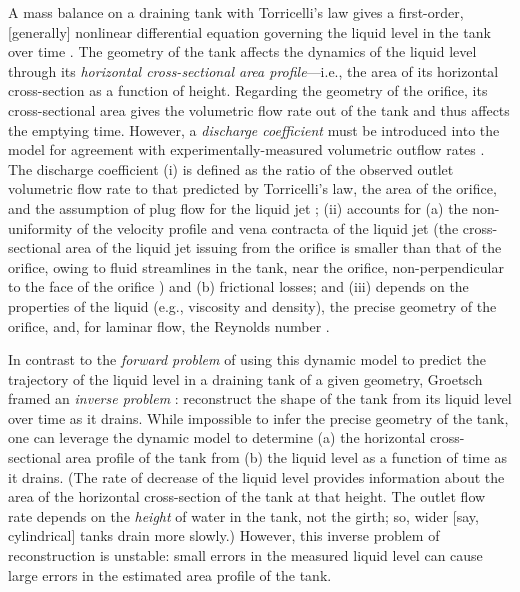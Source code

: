\documentclass[a4paper,fleqn]{cas-dc}
\begin{document}
A mass balance on a draining tank with Torricelli's law gives a first-order, [generally] nonlinear differential equation governing the liquid level in the tank over time \cite{groetsch1993inverse_tl,seborg2016process,debook}.
The geometry of the tank affects the dynamics of the liquid level through its \emph{horizontal cross-sectional area profile}---i.e., the area of its horizontal cross-section as a function of height.
Regarding the geometry of the orifice, its cross-sectional area gives the volumetric flow rate out of the tank and thus affects the emptying time.
However, a \emph{discharge coefficient} \cite{de2000pin,blasone2015discharge,wadhwa2021study,liu2008drainage} must be introduced into the model for agreement with experimentally-measured volumetric outflow rates \cite{farmer1992physical,driver1998torricelli,brady2009siphons,rother2024modelling,paldy1963apparatus,ivanov2014testing,williams2021vessel,pavesi2019investigating,planinvsivc2011holes,saleta2005experimental,lopac2015water,powell2012carrying}.
The discharge coefficient \cite{teoman2022discharge,hicks2014determining,blasone2015discharge,lienhard1984velocity,wadhwa2021study}
(i) is defined as the ratio of the observed outlet volumetric flow rate to that predicted by Torricelli's law, the area of the orifice, and the assumption of plug flow for the liquid jet \cite{hicks2014determining};
(ii) accounts for 
   (a) the non-uniformity of the velocity profile and vena contracta of the liquid jet (the cross-sectional area of the liquid jet issuing from the orifice is smaller than that of the orifice, owing to fluid streamlines in the tank, near the orifice, non-perpendicular to the face of the orifice \cite{horsch2020simple}) and 
   (b) frictional losses; and
(iii) depends on the properties of the liquid (e.g., viscosity and density), the precise geometry of the orifice, and, for laminar flow, the Reynolds number \cite{teoman2022discharge}. 

In contrast to the \emph{forward problem} of using this dynamic model to predict the trajectory of the liquid level in a draining tank of a given geometry, Groetsch \cite{groetsch1993inverse_tl,groetsch1999inverse} framed an \emph{inverse problem} \cite{groetsch1993inverse,neto2012introduction,tarantola2005inverse}: reconstruct the shape of the tank from its liquid level over time as it drains. 
While impossible to infer the precise geometry of the tank, one can leverage the dynamic model to determine
(a) the horizontal cross-sectional area profile of the tank from (b) the liquid level as a function of time as it drains. (The rate of decrease of the liquid level provides information about the area of the horizontal cross-section of the tank at that height. The outlet flow rate depends on the \emph{height} of water in the tank, not the girth; so, wider [say, cylindrical] tanks drain more slowly.)
However, this inverse problem of reconstruction is unstable: small errors in the measured liquid level can cause large errors in the estimated area profile of the tank. \cite{groetsch1993inverse_tl}
\end{document}

